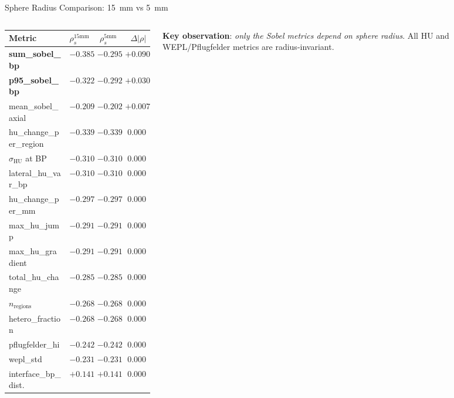 \documentclass[aspectratio=169, 10pt]{beamer}
\begin{document}
\begin{frame}[shrink=5]{Sphere Radius Comparison: \SI{15}{mm} vs \SI{5}{mm}}
  \begin{columns}[T]
    \begin{column}{0.54\textwidth}
      \vspace{-2pt}
      {\small
      \begin{tabular}{lrrr}
        \toprule
        \textbf{Metric} & $\rho_s^{15\text{mm}}$ & $\rho_s^{5\text{mm}}$ & $\Delta|\rho|$ \\
        \midrule
        \textbf{sum\_sobel\_bp}     & $\mathbf{-0.385}$ & $-0.295$ & $\mathbf{+0.090}$ \\
        \textbf{p95\_sobel\_bp}     & $\mathbf{-0.322}$ & $-0.292$ & $\mathbf{+0.030}$ \\
        mean\_sobel\_axial          & $-0.209$ & $-0.202$ & $+0.007$ \\
        \midrule
        hu\_change\_per\_region     & $-0.339$ & $-0.339$ & $0.000$ \\
        $\sigma_{\text{HU}}$ at BP  & $-0.310$ & $-0.310$ & $0.000$ \\
        lateral\_hu\_var\_bp        & $-0.310$ & $-0.310$ & $0.000$ \\
        hu\_change\_per\_mm         & $-0.297$ & $-0.297$ & $0.000$ \\
        max\_hu\_jump               & $-0.291$ & $-0.291$ & $0.000$ \\
        max\_hu\_gradient           & $-0.291$ & $-0.291$ & $0.000$ \\
        total\_hu\_change           & $-0.285$ & $-0.285$ & $0.000$ \\
        $n_{\text{regions}}$        & $-0.268$ & $-0.268$ & $0.000$ \\
        hetero\_fraction            & $-0.268$ & $-0.268$ & $0.000$ \\
        pflugfelder\_hi             & $-0.242$ & $-0.242$ & $0.000$ \\
        wepl\_std                   & $-0.231$ & $-0.231$ & $0.000$ \\
        interface\_bp\_dist.        & $+0.141$ & $+0.141$ & $0.000$ \\
        \bottomrule
      \end{tabular}
      }
    \end{column}
    \begin{column}{0.44\textwidth}
      \textbf{Key observation}: \emph{only the Sobel metrics depend
      on sphere radius}.  All HU and WEPL/Pflugfelder metrics are
      radius-invariant.


\end{column}
\end{columns}
\end{frame}
\end{document}
